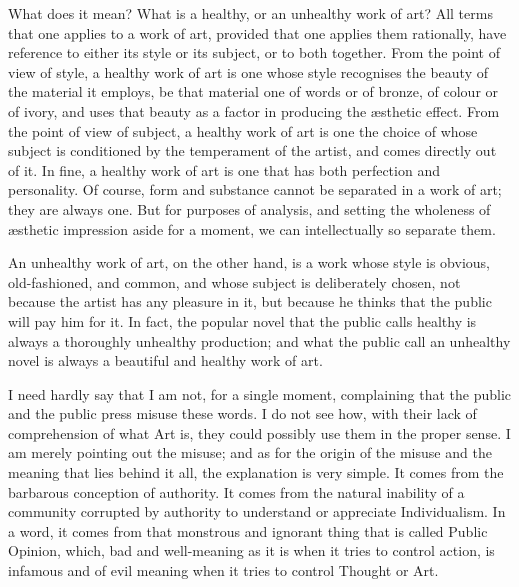 What does it mean? What is a healthy, or an unhealthy work of art? All terms that one applies to a work of art, provided that one applies them rationally, have reference to either its style or its subject, or to both together. From the point of view of style, a healthy work of art is one whose style recognises the beauty of the material it employs, be that material one of words or of bronze, of colour or of ivory, and uses that beauty as a factor in producing the æsthetic effect. From the point of view of subject, a healthy work of art is one the choice of whose subject is conditioned by the temperament of the artist, and comes directly out of it. In fine, a healthy work of art is one that has both perfection and personality. Of course, form and substance cannot be separated in a work of art; they are always one. But for purposes of analysis, and setting the wholeness of æsthetic impression aside for a moment, we can intellectually so separate them.\par

An unhealthy work of art, on the other hand, is a work whose style is obvious, old-fashioned, and common, and whose subject is deliberately chosen, not because the artist has any pleasure in it, but because he thinks that the public will pay him for it. In fact, the popular novel that the public calls healthy is always a thoroughly unhealthy production; and what the public call an unhealthy novel is always a beautiful and healthy work of art.\par

I need hardly say that I am not, for a single moment, complaining that the public and the public press misuse these words. I do not see how, with their lack of comprehension of what Art is, they could possibly use them in the proper sense. I am merely pointing out the misuse; and as for the origin of the misuse and the meaning that lies behind it all, the explanation is very simple. It comes from the barbarous conception of authority. It comes from the natural inability of a community corrupted by authority to understand or appreciate Individualism. In a word, it comes from that monstrous and ignorant thing that is called Public Opinion, which, bad and well-meaning as it is when it tries to control action, is infamous and of evil meaning when it tries to control Thought or Art.\par

